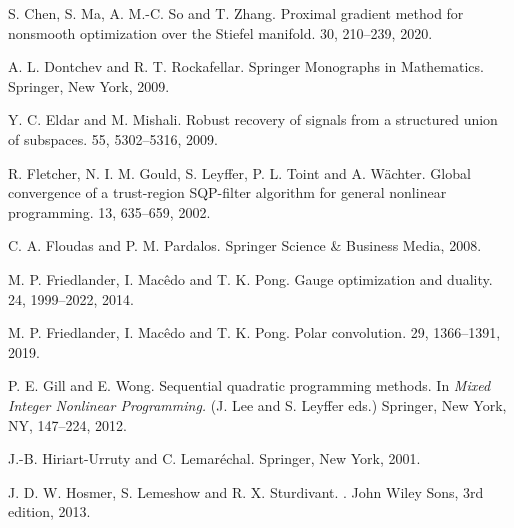 \documentclass[10pt]{article}
\numberwithin{equation}{section}
\begin{document}
\begin{thebibliography}{99}
S. Chen, S. Ma, A. M.-C. So and T. Zhang.
\newblock Proximal gradient method for nonsmooth optimization over the Stiefel manifold.
 30, 210--239, 2020.


 A. L. Dontchev and R. T. Rockafellar.
\newblock Springer Monographs in Mathematics. Springer, New York, 2009.

Y. C. Eldar and M. Mishali.
\newblock Robust recovery of signals from a structured union of subspaces.
 55, 5302--5316, 2009.

R. Fletcher, N. I. M. Gould, S. Leyffer, P. L. Toint and A. W\"{a}chter.
\newblock Global convergence of a trust-region SQP-filter algorithm for general nonlinear programming.
 13, 635--659, 2002.

C. A. Floudas and P. M. Pardalos.
\newblock Springer Science \& Business Media, 2008.

M. P. Friedlander, I. Mac\^{e}do and T. K. Pong.
\newblock Gauge optimization and duality.
 24, 1999--2022, 2014.

M. P. Friedlander, I. Mac\^{e}do and T. K. Pong.
\newblock Polar convolution.
 29, 1366--1391, 2019.


P. E. Gill and E. Wong.
\newblock Sequential quadratic programming methods.
\newblock In {\em  Mixed Integer Nonlinear Programming.} (J. Lee and S. Leyffer eds.) Springer, New York, NY, 147--224, 2012.

J.-B. Hiriart-Urruty and C. Lemar\'{e}chal.
\newblock Springer, New York, 2001.

J. D. W. Hosmer, S. Lemeshow and R. X. Sturdivant.
.
\newblock John Wiley Sons, 3rd edition, 2013.


\end{thebibliography}
\end{document}
